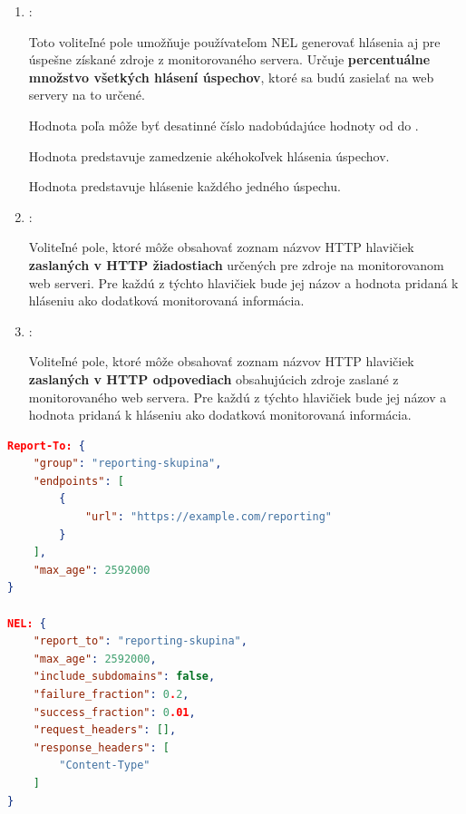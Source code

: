 \begin{enumerate}
    \item {}:

    Toto voliteľné pole umožňuje používateľom NEL generovať hlásenia aj pre úspešne získané zdroje z monitorovaného servera. Určuje \textbf{percentuálne množstvo všetkých hlásení úspechov}, ktoré sa budú zasielať na web servery na to určené.

    Hodnota poľa môže byť desatinné číslo nadobúdajúce hodnoty od  do .
    
    Hodnota  predstavuje zamedzenie akéhokoľvek hlásenia úspechov. 
    
    Hodnota  predstavuje hlásenie každého jedného úspechu.

    \pagebreak
    
    \item {}:

    Voliteľné pole, ktoré môže obsahovať zoznam názvov HTTP hlavičiek \textbf{zaslaných v HTTP žiadostiach} určených pre zdroje na monitorovanom web serveri. 
    Pre každú z týchto hlavičiek bude jej názov a hodnota pridaná k hláseniu ako dodatková monitorovaná informácia.
    
    \item {}:

    Voliteľné pole, ktoré môže obsahovať zoznam názvov HTTP hlavičiek \textbf{zaslaných v HTTP odpovediach} obsahujúcich zdroje zaslané z monitorovaného web servera. 
    Pre každú z týchto hlavičiek bude jej názov a hodnota pridaná k hláseniu ako dodatková monitorovaná informácia.
\end{enumerate}


\begin{center}
\centering
\begin{lstlisting}[caption={\centering Príklad použitia NEL. Zaslané hlavičky týchto dvoch technológií spolupracujú tak, že Reporting API skupinu \code{group} referencuje hlavička NEL svojim poľom \code{report\_to}. Obe pravidlá majú rovnako dlhú platnosť. Hlásenia zlyhaní, ale aj úspechov sa budú tvoriť iba pre \textbf{domény} monitorovaného web servera podľa ich samostatne upravených percentuálnych nastavení. Ako dodatková informácia v hláseniach bude figurovať hlavička \code{Content-Type} z odpovedí monitorovaného web servera. Štruktúra hlásení generovaných týmito pravidlami je popísaná v sekcii \ref{struktura-hlasenia-nel} s konkrétnym \mbox{príkladom hlásenia vo výpise \ref{listing:priklad-nel-report}.}},
label=listing:priklad-nel-header, 
language=json, 
frame=tb,
xleftmargin=.1\textwidth, 
xrightmargin=.1\textwidth]
Report-To: {
    "group": "reporting-skupina",
    "endpoints": [
        {
            "url": "https://example.com/reporting"
        }
    ],
    "max_age": 2592000
}

NEL: {
    "report_to": "reporting-skupina",
    "max_age": 2592000,
    "include_subdomains": false,
    "failure_fraction": 0.2,
    "success_fraction": 0.01,
    "request_headers": [],
    "response_headers": [
        "Content-Type"
    ]
}
\end{lstlisting}
\end{center}


